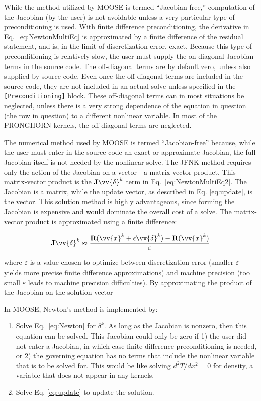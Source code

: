 \documentclass[10pt]{article}
\numberwithin{equation}{section} %
\begin{document}
While the method utilized by MOOSE is termed ``Jacobian-free,'' computation of the Jacobian (by the user) is not avoidable unless a very particular type of preconditioning is used. With finite difference preconditioning, the derivative in Eq.~\eqref{eq:NewtonMultiEq} is approximated by a finite difference of the residual statement, and is, in the limit of discretization error, exact. Because this type of preconditioning is relatively slow, the user must supply the on-diagonal Jacobian terms in the source code. The off-diagonal terms are by default zero, unless also supplied by source code. Even once the off-diagonal terms are included in the source code, they are not included in an actual solve unless specified in the \texttt{[Preconditioning]} block. These off-diagonal terms can in most situations be neglected, unless there is a very strong dependence of the equation in question (the row in question) to a different nonlinear variable. In most of the PRONGHORN kernels, the off-diagonal terms are neglected.

The numerical method used by MOOSE is termed ``Jacobian-free'' because, while the user must enter in the source code an exact or approximate Jacobian, the full Jacobian itself is not needed by the nonlinear solve. The JFNK method requires only the action of the Jacobian on a vector - a matrix-vector product. This matrix-vector product is the \(\textbf{J}\vv{\delta}^k\) term in Eq.~\eqref{eq:NewtonMultiEq2}. The Jacobian is a matrix, while the update vector, as described in Eq. \eqref{eq:update}, is the vector. This solution method is highly advantageous, since forming the Jacobian is expensive and would dominate the overall cost of a solve. The matrix-vector product is approximated using a finite difference:

\begin{equation}
\textbf{J}\vv{\delta}^k\approx\frac{\textbf{R}(\vv{x}^k+\epsilon\vv{\delta}^k)-\textbf{R}(\vv{x}^k)}{\varepsilon}
\end{equation}

where \(\varepsilon\) is a value chosen to optimize between discretization error (smaller \(\varepsilon\) yields more precise finite difference approximations) and machine precision (too small \(\varepsilon\) leads to machine precision difficulties). By approximating the product of the Jacobian on the solution vector

In MOOSE, Newton's method is implemented by:

\begin{enumerate}
\item Solve Eq.~\eqref{eq:Newton} for \(\delta^k\). As long as the Jacobian is nonzero, then this equation can be solved. This Jacobian could only be zero if 1) the user did not enter a Jacobian, in which case finite difference preconditioning is needed, or 2) the governing equation has no terms that include the nonlinear variable that is to be solved for. This would be like solving \(d^2T/dx^2=0\) for density, a variable that does not appear in any kernels.
\item Solve Eq. \eqref{eq:update} to update the solution.
\end{enumerate}
\end{document}
